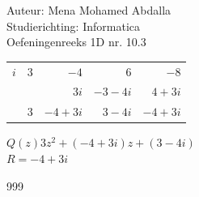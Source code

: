 \documentclass[a4paper]{article}
\begin{document}
\noindent \large Auteur: Mena Mohamed Abdalla \\
\noindent \large Studierichting:  Informatica\\
\noindent \large Oefeningenreeks 1D nr. 10.3\\

\medskip

\normalsize


\begin{tabular}{r|rrrr} 
$i$ & $3$ & $-4$ & $6$ & $-8$ \\ 
    &     & $3i$ & $-3-4i$ & $4+3i$ \\ \hline
    & $3$ & $-4+3i$ & $3-4i$ & $-4+3i$
\end{tabular}

$Q(z) 3z^2 + (-4+3i)z +(3-4i) $\\

$R =-4+3i$


\begin{thebibliography}{999}
\end{thebibliography}
\end{document}
